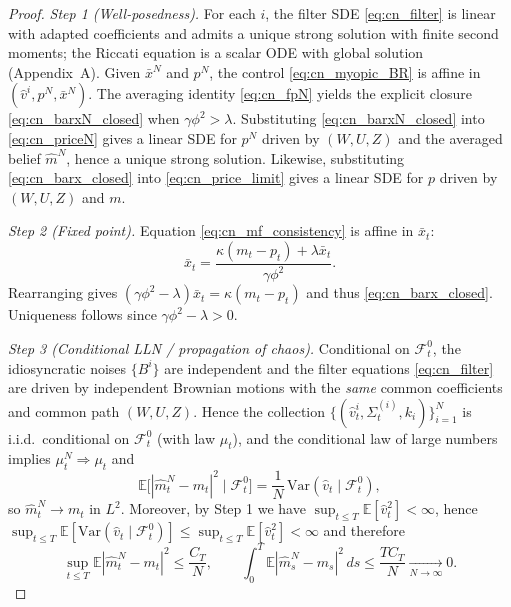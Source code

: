 \begin{proof}
\emph{Step 1 (Well-posedness).}
For each $i$, the filter SDE \eqref{eq:cn_filter} is linear with adapted coefficients and admits a unique strong solution
with finite second moments; the Riccati equation is a scalar ODE with global solution (Appendix~A).
Given $\bar x^N$ and $p^N$, the control \eqref{eq:cn_myopic_BR} is affine in $(\hat v^i,p^N,\bar x^N)$.
The averaging identity \eqref{eq:cn_fpN} yields the explicit closure \eqref{eq:cn_barxN_closed} when
$\gamma\phi^2>\lambda$. Substituting \eqref{eq:cn_barxN_closed} into \eqref{eq:cn_priceN} gives a linear SDE for $p^N$
driven by $(W,U,Z)$ and the averaged belief $\hat m^N$, hence a unique strong solution. Likewise, substituting
\eqref{eq:cn_barx_closed} into \eqref{eq:cn_price_limit} gives a linear SDE for $p$ driven by $(W,U,Z)$ and $m$.

\emph{Step 2 (Fixed point).}
Equation \eqref{eq:cn_mf_consistency} is affine in $\bar x_t$:
\[
\bar x_t = \frac{\kappa(m_t-p_t)+\lambda \bar x_t}{\gamma\phi^2}.
\]
Rearranging gives $(\gamma\phi^2-\lambda)\bar x_t=\kappa(m_t-p_t)$ and thus \eqref{eq:cn_barx_closed}.
Uniqueness follows since $\gamma\phi^2-\lambda>0$.

\emph{Step 3 (Conditional LLN / propagation of chaos).}
Conditional on $\mathcal F^0_t$, the idiosyncratic noises $\{B^i\}$ are independent and the filter equations
\eqref{eq:cn_filter} are driven by independent Brownian motions with the \emph{same} common coefficients and common path
$(W,U,Z)$. Hence the collection $\{(\hat v^i_t,\Sigma^{(i)}_t,k_i)\}_{i=1}^N$ is i.i.d.\ conditional on $\mathcal F^0_t$
(with law $\mu_t$), and the conditional law of large numbers implies $\mu^N_t\Rightarrow \mu_t$ and
\[
 \mathbb E\bigl[|\hat m^N_t-m_t|^2\mid \mathcal F^0_t\bigr]
 = \frac{1}{N}\,\mathrm{Var}(\hat v_t\mid \mathcal F^0_t),
 \]
 so $\hat m^N_t\to m_t$ in $L^2$. Moreover, by Step 1 we have $\sup_{t\le T}\mathbb E[\hat v_t^2]<\infty$, hence
 $\sup_{t\le T}\mathbb E[\mathrm{Var}(\hat v_t\mid \mathcal F^0_t)]\le \sup_{t\le T}\mathbb E[\hat v_t^2]<\infty$ and therefore
 \[
 \sup_{t\le T}\mathbb E|\hat m^N_t-m_t|^2 \le \frac{C_T}{N},
 \qquad
 \int_0^T \mathbb E|\hat m^N_s-m_s|^2\,ds \le \frac{TC_T}{N}\xrightarrow[N\to\infty]{}0.
 \]


\end{proof}
